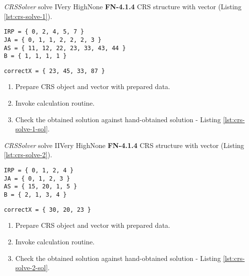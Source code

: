 \begin{testcase}{\emph{CRSSolver} solve I}{Very High}{None}
		{
			\textbf{FN-4.1.4}
		}
		{
			\gls{CRS} structure with vector (Listing \ref{lst:crs-solve-1}).	
		}
		\begin{lstlisting}[label={lst:crs-solve-1},caption={\gls{CRS} format and vector data example}, frame=single]
IRP = { 0, 2, 4, 5, 7 }
JA = { 0, 1, 1, 2, 2, 2, 3 }
AS = { 11, 12, 22, 23, 33, 43, 44 }
B = { 1, 1, 1, 1 }
		\end{lstlisting}
		\begin{lstlisting}[label={lst:crs-solve-1-sol},caption={\gls{CRS} format and vector data example}, frame=single]
correctX = { 23, 45, 33, 87 }
		\end{lstlisting}

		{	
			\begin{enumerate}
				\item Prepare \gls{CRS} object and vector with prepared data.
				\item Invoke calculation routine.
				\item
				{
					Check the obtained solution against hand-obtained solution - Listing \ref{lst:crs-solve-1-sol}.
				}
			\end{enumerate}
		}
	\end{testcase}
	\begin{testcase}{\emph{CRSSolver} solve II}{Very High}{None}
		{
			\textbf{FN-4.1.4}
		}
		{
			\gls{CRS} structure with vector (Listing \ref{lst:crs-solve-2}).	
		}
		\begin{lstlisting}[label={lst:crs-solve-2},caption={\gls{CRS} format and vector data example}, frame=single]
IRP = { 0, 1, 2, 4 }
JA = { 0, 1, 2, 3 }
AS = { 15, 20, 1, 5 }
B = { 2, 1, 3, 4 }
		\end{lstlisting}
		\begin{lstlisting}[label={lst:crs-solve-2-sol},caption={\gls{CRS} format and vector data example}, frame=single]
correctX = { 30, 20, 23 }
		\end{lstlisting}
		
		{
			\begin{enumerate}
				\item Prepare \gls{CRS} object and vector with prepared data.
				\item Invoke calculation routine.
				\item
				{
					Check the obtained solution against hand-obtained solution - Listing \ref{lst:crs-solve-2-sol}.
				}
			\end{enumerate}
		}
	\end{testcase}